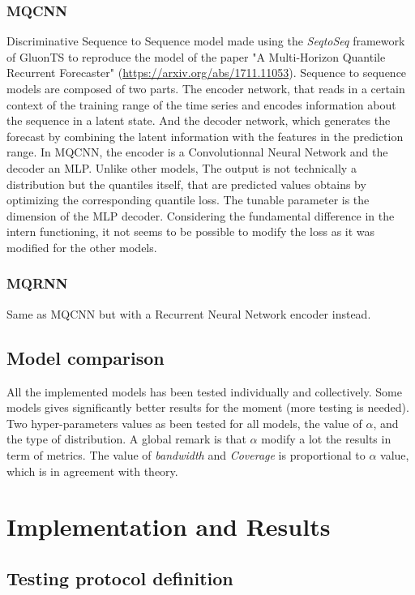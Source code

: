\documentclass[a4paper, 12pt]{article}
\begin{document}
\subsubsection{MQCNN}
Discriminative Sequence to Sequence model made using the \textit{SeqtoSeq} framework of GluonTS to reproduce the model of the 
paper "A Multi-Horizon Quantile Recurrent Forecaster" (\url{https://arxiv.org/abs/1711.11053}).
Sequence to sequence models are composed of two parts. The encoder network, that reads in a certain context of the training range of the time series 
and encodes information about  the  sequence  in  a  latent  state.
And the decoder network, which generates the forecast by combining the latent information with the features in the prediction range.
In MQCNN, the encoder is a Convolutionnal Neural Network and the decoder an MLP. Unlike other models, The output is not technically a distribution but the quantiles itself, that are predicted values obtains by optimizing the corresponding quantile loss.
The tunable parameter is the  dimension of the MLP decoder.
Considering the fundamental difference in the intern functioning, it not seems to be possible to modify the loss as it was modified for the other models.

\subsubsection{MQRNN}
Same as MQCNN but with a Recurrent Neural Network encoder instead.

\subsection{Model comparison}

All the implemented models has been tested individually and collectively. 
Some models gives significantly better results for the moment (more testing is needed).
Two hyper-parameters values as been tested for all models, the value of $\alpha$, and the type of distribution.
A global remark is that $\alpha$ modify a lot the results in term of metrics. The value of \textit{bandwidth } and \textit{Coverage} is proportional to $\alpha$ value, which is in agreement with theory.

\section{Implementation and Results}

\subsection{Testing protocol definition}
\end{document}
